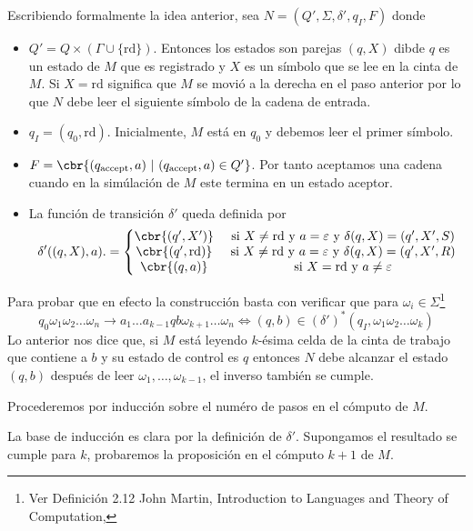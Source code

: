 \documentclass{article}
\begin{document}
Escribiendo formalmente la idea anterior, sea $N=(Q',\Sigma,\delta',q_{I},F)$ donde 
\begin{itemize}
    \item $Q'=Q\times (\Gamma \cup \{\text{rd}\})$. Entonces los estados son parejas $(q,X)$ dibde $q$ es un estado de $M$ que es registrado y $X$ es un símbolo que se lee en la cinta de $M$. Si $X=\text{rd}$ significa que $M$ se movió a la derecha en el paso anterior por lo que $N$ debe leer el siguiente símbolo de la cadena de entrada. 
    \item $q_I=(q_0,\text{rd})$. Inicialmente, $M$ está en $q_0$ y debemos leer el primer símbolo. 
    \item $F=\cbr{(q_{\text{accept}},a)\ |\ (q_{\text{accept}},a)\in Q'}$. Por tanto aceptamos una cadena cuando en la simúlación de $M$ este termina en un estado aceptor. 
    \item La función de transición $\delta'$ queda definida por 
    \[
        \delta'((q,X),a).=\left\lbrace\begin{matrix}
        \cbr{(q',X')}&\text{ si } X\neq \text{rd}\text{ y }a=\varepsilon\text{ y }\delta(q,X)=(q',X',S)\\            
        \cbr{(q',\text{rd})}&\text{ si } X\neq \text{rd}\text{ y }a=\varepsilon\text{ y }\delta(q,X)=(q',X',R)
        \\ 
        \cbr{(q,a)}&\text{ si }X=\text{rd}\text{ y }a\neq\varepsilon    
        \end{matrix}\right.
    \]
\end{itemize}

Para probar que en efecto la construcción basta con verificar que para $\omega_i\in\Sigma$\footnote{Ver Definición 2.12 John Martin, Introduction to Languages and Theory of Computation, }
\begin{equation}
    \label{HI}
q_0\omega_1\omega_2\dots\omega_n\to a_1\dots a_{k-1}qb\omega_{k+1}\dots\omega_n\Leftrightarrow (q,b)\in (\delta')^{\ast}(q_I,\omega_1\omega_2\dots\omega_k)    
\end{equation}
Lo anterior nos dice que, si $M$ está leyendo $k$-ésima celda de la cinta de trabajo que contiene a $b$ y su estado de control es $q$ entonces $N$ debe alcanzar el estado $(q,b)$ después de leer $\omega_1,\dots,\omega_{k-1}$, el inverso también se cumple. 

Procederemos por inducción sobre el numéro de pasos en el cómputo de $M$. 

La base de inducción es clara por la definición de $\delta'$. Supongamos el resultado se cumple para $k$, probaremos la proposición en el cómputo $k+1$ de $M$.
\end{document}
